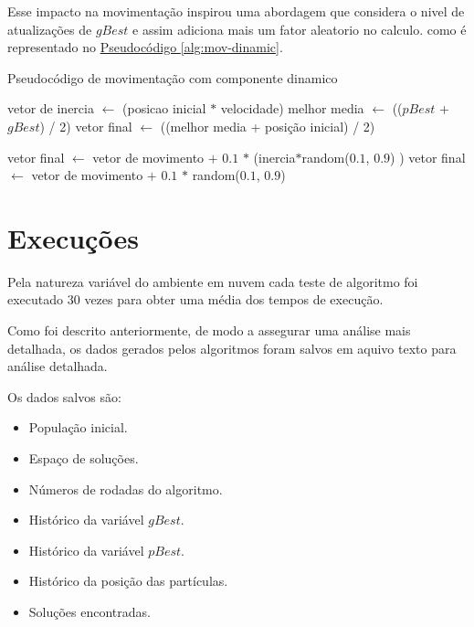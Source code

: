 Esse impacto na movimentação inspirou uma abordagem que considera o nivel de atualizações de $gBest$ e assim adiciona mais um fator aleatorio no calculo. como é representado no 
\hyperref[alg:mov-dinamic]{Pseudocódigo \ref{alg:mov-dinamic}}.
\begin{algorithm}
    \caption{Pseudocódigo de movimentação com componente dinamico}\label{alg:mov-dinamic}
\begin{algorithmic}

\State vetor de inercia $\gets$ (posicao inicial $*$ velocidade)
\State melhor media $\gets$ (($pBest$ + $gBest$) / 2)
\State vetor final $\gets$ ((melhor media + posição inicial) / 2)

    \State vetor final $\gets$ vetor de movimento $+$ $0.1$ $*$ (inercia$*$random($0.1$, $0.9$) )
\Else
    \State vetor final $\gets$ vetor de movimento $+$ $0.1$ $*$ random($0.1$, $0.9$) 
\EndIf    
\end{algorithmic}
\end{algorithm}

\section{Execuções}
Pela natureza variável do ambiente em nuvem cada teste de algoritmo foi executado 30 vezes para obter uma média dos tempos de execução.\hfill\vspace{\onelineskip}

Como foi descrito anteriormente, de modo a assegurar uma análise mais detalhada, os dados gerados pelos algoritmos foram salvos em aquivo texto para análise detalhada.\hfill\vspace{\onelineskip}

Os dados salvos são:
\begin{itemize}
\item População inicial.
\item Espaço de soluções.
\item Números de rodadas do algoritmo.
\item Histórico da variável $gBest$.
\item Histórico da variável $pBest$.
\item Histórico da posição das partículas.
\item Soluções encontradas.
\end{itemize}

